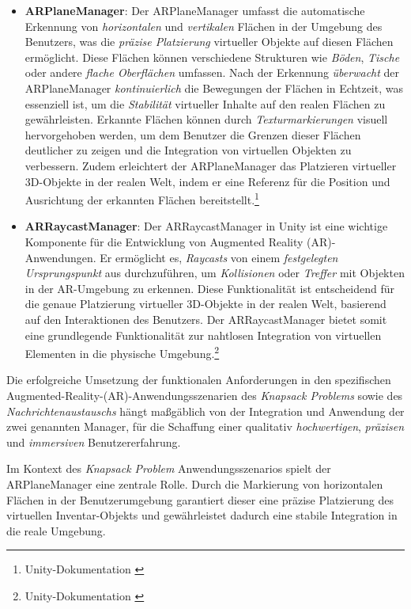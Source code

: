 \begin{itemize}
    \item \textbf{ARPlaneManager}:
    Der ARPlaneManager umfasst die automatische Erkennung von
    \textit{horizontalen} und \textit{vertikalen} Flächen in der Umgebung des Benutzers, was die \textit{präzise Platzierung}
    virtueller Objekte auf diesen Flächen ermöglicht. Diese Flächen können verschiedene Strukturen wie \textit{Böden},
    \textit{Tische} oder andere \textit{flache Oberflächen} umfassen. Nach der Erkennung \textit{überwacht} der ARPlaneManager
    \textit{kontinuierlich} die Bewegungen der Flächen in Echtzeit, was essenziell ist, um die \textit{Stabilität}
    virtueller Inhalte auf den realen Flächen zu gewährleisten. Erkannte Flächen können durch \textit{Texturmarkierungen}
    visuell hervorgehoben werden, um dem Benutzer die Grenzen dieser Flächen deutlicher zu zeigen und die Integration von
    virtuellen Objekten zu verbessern. Zudem erleichtert der ARPlaneManager das Platzieren virtueller 3D-Objekte in der
    realen Welt, indem er eine Referenz für die Position und Ausrichtung der erkannten Flächen bereitstellt.\footnote{Unity-Dokumentation \cite{Plane Manager}}

    \item \textbf{ARRaycastManager}:
    Der ARRaycastManager in Unity ist eine wichtige Komponente für die Entwicklung von Augmented Reality (AR)-Anwendungen.
    Er ermöglicht es, \textit{Raycasts} von einem \textit{festgelegten Ursprungspunkt} aus durchzuführen, um \textit{Kollisionen}
    oder \textit{Treffer} mit Objekten in der AR-Umgebung zu erkennen. Diese Funktionalität ist entscheidend für die
    genaue Platzierung virtueller 3D-Objekte in der realen Welt, basierend auf den Interaktionen des Benutzers. Der
    ARRaycastManager bietet somit eine grundlegende Funktionalität zur nahtlosen Integration von virtuellen Elementen
    in die physische Umgebung.\footnote{Unity-Dokumentation \cite{Raycast Manager}}
\end{itemize}
Die erfolgreiche Umsetzung der funktionalen Anforderungen in den spezifischen Augmented-Reality-(AR)-Anwendungsszenarien
des \textit{Knapsack Problems} sowie des \textit{Nachrichtenaustauschs} hängt maßgäblich von der Integration und Anwendung der zwei
genannten Manager, für die Schaffung einer qualitativ \textit{hochwertigen}, \textit{präzisen} und \textit{immersiven}
Benutzererfahrung.

Im Kontext des \textit{Knapsack Problem} Anwendungsszenarios spielt der ARPlaneManager eine zentrale Rolle. Durch die
Markierung von horizontalen Flächen in der Benutzerumgebung garantiert dieser eine präzise Platzierung des virtuellen
Inventar-Objekts und gewährleistet dadurch eine stabile Integration in die reale Umgebung.

